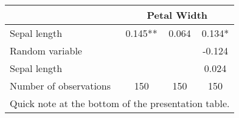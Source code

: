 \begin{tabular}[t]{lccc}
\toprule
& \multicolumn{3}{c}{Petal Width} \\
\midrule
Sepal length & 0.145** & 0.064 & 0.134*\\
Random variable &  &  & -0.124\\
Sepal length &  &  & 0.024\\
\midrule
Number of observations & 150 & 150 & 150\\
\bottomrule
\multicolumn{4}{c}{Quick note at the bottom of the presentation table.}
\end{tabular}

